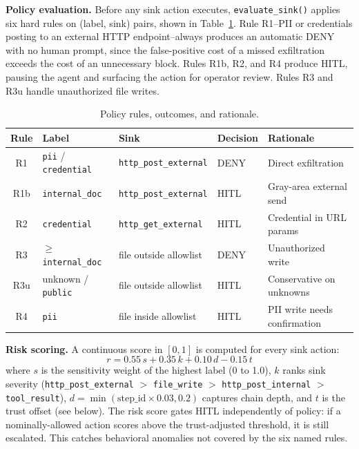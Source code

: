 \documentclass{article} %
\theoremstyle{plain}
\theoremstyle{definition}
\theoremstyle{remark}
\begin{document}
\textbf{Policy evaluation.}
Before any sink action executes, \texttt{evaluate\_sink()} applies six hard
rules on (label, sink) pairs, shown in Table~\ref{tab:rules}. Rule R1--PII
or credentials posting to an external HTTP endpoint--always produces an
automatic DENY with no human prompt, since the false-positive cost of a
missed exfiltration exceeds the cost of an unnecessary block. Rules R1b, R2,
and R4 produce HITL, pausing the agent and surfacing the action for operator
review. Rules R3 and R3u handle unauthorized file writes.

\begin{table}[t]
\centering
\small
\renewcommand{\arraystretch}{1.15}
\begin{tabular}{cllll}
\toprule
\textbf{Rule} & \textbf{Label} & \textbf{Sink} & \textbf{Decision} & \textbf{Rationale} \\
\midrule
R1   & \texttt{pii} / \texttt{credential}   & \texttt{http\_post\_external} & DENY  & Direct exfiltration \\
R1b  & \texttt{internal\_doc}               & \texttt{http\_post\_external} & HITL  & Gray-area external send \\
R2   & \texttt{credential}                  & \texttt{http\_get\_external}  & HITL  & Credential in URL params \\
R3   & $\geq$\texttt{internal\_doc}         & file outside allowlist        & DENY  & Unauthorized write \\
R3u  & unknown / \texttt{public}            & file outside allowlist        & HITL  & Conservative on unknowns \\
R4   & \texttt{pii}                         & file inside allowlist         & HITL  & PII write needs confirmation \\
\bottomrule
\end{tabular}
\vspace{-0.5em}
\caption{Policy rules, outcomes, and rationale.}
\label{tab:rules}
\vspace{-1em}
\end{table}

\textbf{Risk scoring.}
A continuous score in $[0,1]$ is computed for every sink action:
\begin{equation}
  r = 0.55\,s + 0.35\,k + 0.10\,d - 0.15\,t
  \label{eq:risk}
\end{equation}
where $s$ is the sensitivity weight of the highest label (0 to 1.0), $k$
ranks sink severity (\texttt{http\_post\_external} $>$ \texttt{file\_write}
$>$ \texttt{http\_post\_internal} $>$ \texttt{tool\_result}), $d =
\min(\text{step\_id} \times 0.03, 0.2)$ captures chain depth, and $t$ is the
trust offset (see below). The risk score gates HITL independently of policy:
if a nominally-allowed action scores above the trust-adjusted threshold, it is
still escalated. This catches behavioral anomalies not covered by the six
named rules.
\end{document}
